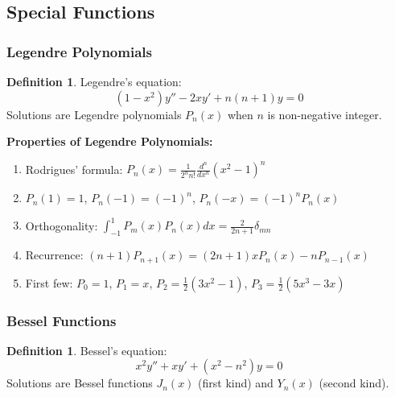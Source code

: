 \documentclass[12pt,a4paper]{article}
\theoremstyle{definition}
\newtheorem{definition}[theorem]{Definition}
\begin{document}
\subsection{Special Functions}

\subsubsection{Legendre Polynomials}

\begin{definition}
Legendre's equation:
\[
(1 - x^2)y'' - 2xy' + n(n+1)y = 0
\]
Solutions are Legendre polynomials $P_n(x)$ when $n$ is non-negative integer.
\end{definition}

\begin{importantbox}
\textbf{Properties of Legendre Polynomials:}
\begin{enumerate}
    \item Rodrigues' formula: $P_n(x) = \frac{1}{2^n n!}\frac{d^n}{dx^n}(x^2 - 1)^n$
    
    \item $P_n(1) = 1$, $P_n(-1) = (-1)^n$, $P_n(-x) = (-1)^n P_n(x)$
    
    \item Orthogonality: $\int_{-1}^{1} P_m(x)P_n(x)dx = \frac{2}{2n+1}\delta_{mn}$
    
    \item Recurrence: $(n+1)P_{n+1}(x) = (2n+1)xP_n(x) - nP_{n-1}(x)$
    
    \item First few: $P_0 = 1$, $P_1 = x$, $P_2 = \frac{1}{2}(3x^2 - 1)$, $P_3 = \frac{1}{2}(5x^3 - 3x)$
\end{enumerate}
\end{importantbox}

\subsubsection{Bessel Functions}

\begin{definition}
Bessel's equation:
\[
x^2y'' + xy' + (x^2 - n^2)y = 0
\]
Solutions are Bessel functions $J_n(x)$ (first kind) and $Y_n(x)$ (second kind).
\end{definition}
\end{document}
